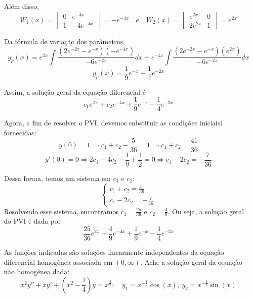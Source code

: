 \documentclass[oneside,12pt,a4paper]{report}
\begin{document}
\begin{resolucao}
    Além disso,
    \[W_1(x)=\begin{vmatrix}
        0 & e^{-4x}\\
        1 & -4e^{-4x}
    \end{vmatrix}=-e^{-4x}\quad e \quad W_2(x)=\begin{vmatrix}
        e^{2x}  & 0\\
        2e^{2x} & 1
    \end{vmatrix}=e^{2x}\]

    Da fórmula de variação dos parâmetros,
    \[y_p(x)=e^{2x}\int\frac{(2e^{-2x}-e^{-x})(-e^{-4x})}{-6e^{-2x}}dx+e^{-4x}\int\frac{(2e^{-2x}-e^{-x})(e^{2x})}{-6e^{-2x}}dx\]
    \[y_p(x)=\frac{1}{9}e^{-x}-\frac{1}{4}e^{-2x}\]

    Assim, a solução geral da equação diferencial é
    \[\boxed{c_1e^{2x}+c_2e^{-4x}+\frac{1}{9}e^{-x}-\frac{1}{4}e^{-2x}}\]

    Agora, a fim de resolver o PVI, devemos substituir as condições iniciaisi fornecidas:
    \[y(0)=1\Rightarrow c_1+c_2-\frac{5}{36}=1\Rightarrow c_1+c_2=\frac{41}{36}\]
    \[y'(0)=0\Rightarrow 2c_1-4c_2-\frac{1}{9}+\frac{1}{2}=0\Rightarrow c_1-2c_2=-\frac{7}{36}\]

    Dessa forma, temos um sistema em $c_1$ e $c_2$:
    \[\begin{cases}
        c_1+c_2=\frac{41}{36}\\
        c_1-2c_2=-\frac{7}{36}
    \end{cases}\]
    Resolvendo esse sistema, encontramos $c_1=\frac{25}{36}$ e $c_2=\frac{4}{9}$. Ou seja, a solução geral do PVI é dada por
    \[\boxed{\frac{25}{36}e^{2x}+\frac{4}{9}e^{-4x}+\frac{1}{9}e^{-x}-\frac{1}{4}e^{-2x}}\]

\end{resolucao}

 As funções indicadas são soluções linearmente independentes da equação diferencial homogênea associada em $(0,\infty)$. Ache a solução geral da equação não homogênea dada:
\[x^2y''+xy'+\left(x^2-\frac{1}{4}\right)y=x^\frac{3}{2};\quad y_1=x^{-\frac{1}{2}}\cos(x),~y_2=x^{-\frac{1}{2}}\sin(x)\]
\end{document}
